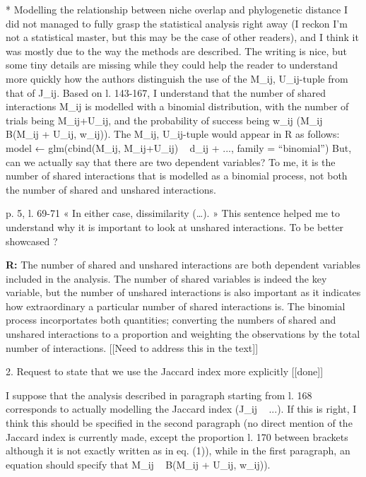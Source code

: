 \documentclass[12pt]{letter}
\newenvironment{refquote}{\bigskip \begin{it}}{\end{it}\smallskip}
\begin{document}
	\begin{refquote}
		* Modelling the relationship between niche overlap and phylogenetic distance
		I did not managed to fully grasp the statistical analysis right away (I reckon I'm not a statistical master, but this may be the case of other readers), and I think it was mostly due to the way the methods are described. The writing is nice, but some tiny details are missing while they could help the reader to understand more quickly how the authors distinguish the use of the {M_ij, U_ij}-tuple from that of J_ij.
		Based on l. 143-167, I understand that the number of shared interactions M_ij is modelled with a binomial distribution, with the number of trials being M_ij+U_ij, and the probability of success being w_ij (M_ij ~ B(M_ij + U_ij, w_ij)). The {M_ij, U_ij}-tuple would appear in R as follows:
		model ← glm(cbind(M_ij, M_ij+U_ij) ~ d_ij + ..., family = “binomial”)
		But, can we actually say that there are two dependent variables? To me, it is the number of shared interactions that is modelled as a binomial process, not both the number of shared and unshared interactions.

		\smallskip

		p. 5, l. 69-71 « In either case, dissimilarity (…). » This sentence helped me to understand why it is important to look at unshared interactions. To be better showcased ?

	\end{refquote}


	\textbf{R:} The number of shared and unshared interactions are both dependent variables included in the analysis. The number of shared variables is indeed the key variable, but the number of unshared interactions is also important as it indicates how extraordinary a particular number of shared interactions is. The binomial process incorportates both quantities; converting the numbers of shared and unshared interactions to a proportion and weighting the observations by the total number of interactions. [[Need to address this in the text]]


2. Request to state that we use the Jaccard index more explicitly [[done]]

	\begin{refquote}
		I suppose that the analysis described in paragraph starting from l. 168 corresponds to actually modelling the Jaccard index (J_ij ~ ...). If this is right, I think this should be specified in the second paragraph (no direct mention of the Jaccard index is currently made, except the proportion l. 170 between brackets although it is not exactly written as in eq. (1)), while in the first paragraph, an equation should specify that M_ij ~ B(M_ij + U_ij, w_ij)).
	\end{refquote}
\end{document}
